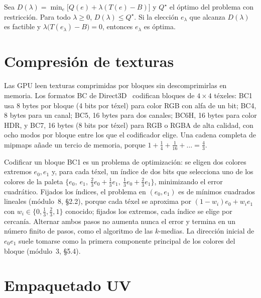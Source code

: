 \begin{proposicion}\label{prop:dual}
Sea $D(\lambda)=\min_e\bigl[Q(e)+\lambda(T(e)-B)\bigr]$ y $Q^\star$ el óptimo del problema con restricción. Para todo $\lambda\ge 0$, $D(\lambda)\le Q^\star$. Si la elección $e_\lambda$ que alcanza $D(\lambda)$ es factible y $\lambda\bigl(T(e_\lambda)-B\bigr)=0$, entonces $e_\lambda$ es óptima.
\end{proposicion}

\addtocounter{definicion}{1}%

\section{Compresión de texturas}

Las GPU leen texturas comprimidas por bloques sin descomprimirlas en memoria. Los formatos BC de Direct3D~\cite{msbc} codifican bloques de $4\times 4$ téxeles: BC1 usa 8 bytes por bloque (4 bits por téxel) para color RGB con alfa de un bit; BC4, 8 bytes para un canal; BC5, 16 bytes para dos canales; BC6H, 16 bytes para color HDR, y BC7, 16 bytes (8 bits por téxel) para RGB o RGBA de alta calidad, con ocho modos por bloque entre los que el codificador elige. Una cadena completa de mipmaps añade un tercio de memoria, porque $1+\tfrac14+\tfrac1{16}+\dots=\tfrac43$.

Codificar un bloque BC1 es un problema de optimización: se eligen dos colores extremos $e_0,e_1$ y, para cada téxel, un índice de dos bits que selecciona uno de los colores de la paleta $\{e_0,\ e_1,\ \tfrac23e_0+\tfrac13e_1,\ \tfrac13e_0+\tfrac23e_1\}$, minimizando el error cuadrático. Fijados los índices, el problema en $(e_0,e_1)$ es de mínimos cuadrados lineales (módulo~8, §2.2), porque cada téxel se aproxima por $(1-w_i)e_0+w_ie_1$ con $w_i\in\{0,\tfrac13,\tfrac23,1\}$ conocido; fijados los extremos, cada índice se elige por cercanía. Alternar ambos pasos no aumenta nunca el error y termina en un número finito de pasos, como el algoritmo de las $k$-medias. La dirección inicial de $e_0e_1$ suele tomarse como la primera componente principal de los colores del bloque (módulo~3, §5.4).

\section{Empaquetado UV}

